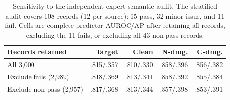 \begin{table}[t]
\centering
\small
\setlength{\tabcolsep}{2.6pt}
\caption{Sensitivity to the independent expert semantic audit. The stratified
audit covers 108 records (12 per source): 65 pass, 32 minor issue, and 11 fail.
Cells are complete-predictor AUROC/AP after retaining all records, excluding the
11 fails, or excluding all 43 non-pass records.}
\label{tab:semantic-audit-sensitivity}
\begin{tabular*}{\textwidth}{@{\extracolsep{\fill}}lrrrr@{}}
\toprule
Records retained & Target & Clean & N-dmg. & C-dmg. \\
\midrule
All 3,000 & .815/.357 & .810/.330 & .858/.396 & .856/.382 \\
Exclude fails (2,989) & .818/.369 & .813/.341 & .858/.392 & .855/.384 \\
Exclude non-pass (2,957) & .817/.368 & .813/.344 & .857/.398 & .853/.391 \\
\bottomrule
\end{tabular*}

\end{table}
